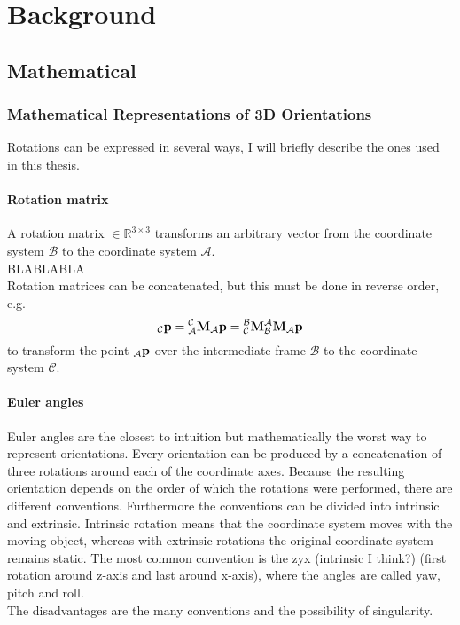 \chapter{Background}
\label{ch:Background}

\section{Mathematical}
\subsection{Mathematical Representations of 3D Orientations}
Rotations can be expressed in several ways, I will briefly describe the ones used in this thesis.

\subsubsection{Rotation matrix}
A rotation matrix  $\in \mathbb{R}^{3\times3}$ transforms an arbitrary vector from the coordinate system $\mathcal{B}$ to the coordinate system $\mathcal{A}$.\\
BLABLABLA\\
Rotation matrices can be concatenated, but this must be done in reverse order, e.g.
\begin{equation}
	{}_\mathcal{C}\vb{p} = \mtf{c}{a}{}_\mathcal{A}\vb{p} = \mtf{b}{c}\mtf{a}{b}{}_\mathcal{A}\vb{p}
\end{equation}
to transform the point ${}_\mathcal{A}\vb{p}$ over the intermediate frame $\mathcal{B}$ to the coordinate system $\mathcal{C}$.

\subsubsection{Euler angles}
Euler angles are the closest to intuition but mathematically the worst way to represent orientations.
Every orientation can be produced by a concatenation of three rotations around each of the coordinate axes.
Because the resulting orientation depends on the order of which the rotations were performed, there are different conventions.
Furthermore the conventions can be divided into intrinsic and extrinsic.
Intrinsic rotation means that the coordinate system moves with the moving object, whereas with extrinsic rotations the original coordinate system remains static.
The most common convention is the zyx (intrinsic I think?) (first rotation around z-axis and last around x-axis), where the angles are called yaw, pitch and roll.\\
The disadvantages are the many conventions and the possibility of singularity.

